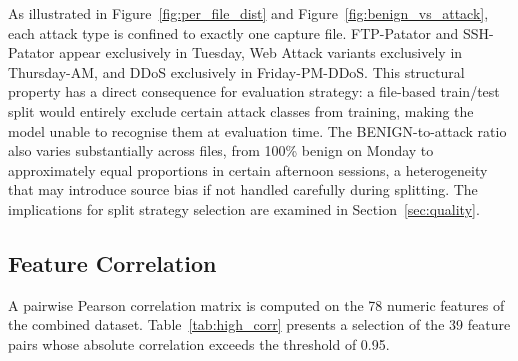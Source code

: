 \documentclass[12pt,a4paper]{article}
\begin{document}
As illustrated in Figure~\ref{fig:per_file_dist} and Figure~\ref{fig:benign_vs_attack},
each attack type is confined to exactly one capture file. FTP-Patator and SSH-Patator
appear exclusively in Tuesday, Web Attack variants exclusively in Thursday-AM, and DDoS
exclusively in Friday-PM-DDoS. This structural property has a direct consequence for
evaluation strategy: a file-based train/test split would entirely exclude certain attack
classes from training, making the model unable to recognise them at evaluation time.
The BENIGN-to-attack ratio also varies substantially across files, from 100\% benign on
Monday to approximately equal proportions in certain afternoon sessions, a heterogeneity
that may introduce source bias if not handled carefully during splitting. The implications
for split strategy selection are examined in Section~\ref{sec:quality}.

\subsection{Feature Correlation}

A pairwise Pearson correlation matrix is computed on the 78 numeric features of the
combined dataset. Table~\ref{tab:high_corr} presents a selection of the 39 feature
pairs whose absolute correlation exceeds the threshold of 0.95.
\end{document}
